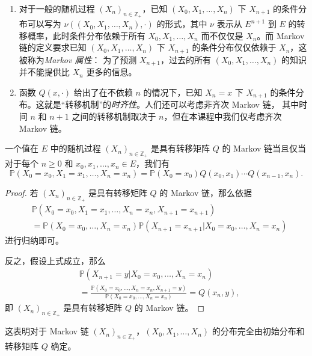 \documentclass[fontset=none]{Notes}
\begin{document}
\begin{remark}
  \mbox{}
  \begin{enumerate}
    \item 对于一般的随机过程 $(X_n)_{n\in \mathbb{Z}_+}$，已知 $(X_0,X_1,\dots,X_n)$
    下 $X_{n+1}$ 的条件分布可以写为 $\nu((X_0,X_1,\dots,X_n),\cdot)$ 的形式，其中
    $\nu$ 表示从 $E^{n+1}$ 到 $E$ 的转移概率，此时条件分布依赖于所有 $X_0,X_1,\dots,X_n$
    而不仅仅是 $X_n$。而 Markov 链的定义要求已知 $(X_0,X_1,\dots,X_n)$
    下 $X_{n+1}$ 的条件分布仅仅依赖于 $X_n$，这被称为\emph{Markov 属性}：
    为了预测 $X_{n+1}$，过去的所有 $(X_0,X_1,\dots,X_n)$ 的知识并不能提供比 $X_n$
    更多的信息。  
    \item 函数 $Q(x,\cdot)$ 给出了在不依赖 $n$ 的情况下，已知 $X_n=x$ 下 $X_{n+1}$
    的条件分布。这就是“转移机制”的\emph{时齐性}。人们还可以考虑非齐次 Markov 链，
    其中时间 $n$ 和 $n + 1$ 之间的转移机制取决于 $n$，但在本课程中我们仅考虑齐次 Markov 链。
  \end{enumerate}
\end{remark}

\begin{proposition}
  一个值在 $E$ 中的随机过程 $(X_n)_{n\in \mathbb{Z}_+}$ 是具有转移矩阵 $Q$ 的 Markov 链当且仅当
  对于每个 $n\geq 0$ 和 $x_0,x_1,\dots,x_n\in E$，我们有
  \[
    \mathbb{P}(X_0=x_0,X_1=x_1,\dots,X_n=x_n)=\mathbb{P}(X_0=x_0)
    Q(x_0,x_1)\cdots Q(x_{n-1},x_n).
  \]
\end{proposition}
\begin{proof}
  若 $(X_n)_{n\in \mathbb{Z}_+}$ 是具有转移矩阵 $Q$ 的 Markov 链，那么依据
  \begin{align*}
    &\mathbb{P}(X_0=x_0,X_1=x_1,\dots,X_n=x_n,X_{n+1}=x_{n+1})\\
    &=\mathbb{P}(X_0=x_0,\dots,X_n=x_n)\mathbb{P}(X_{n+1}=x_{n+1}|X_0=x_0,\dots,X_n=x_n)
  \end{align*}
  进行归纳即可。

  反之，假设上式成立，那么
  \begin{align*}
    &\mathbb{P}(X_{n+1}=y|X_0=x_0,\dots,X_n=x_n)\\
    &=\frac{\mathbb{P}(X_0=x_0,\dots,X_n=x_n,X_{n+1}=y)}{\mathbb{P}(X_0=x_0,\dots,X_n=x_n)}
    =Q(x_n,y),
  \end{align*}
  即 $(X_n)_{n\in \mathbb{Z}_+}$ 是具有转移矩阵 $Q$ 的 Markov 链。
\end{proof}

\begin{remark}
  这表明对于 Markov 链 $(X_n)_{n\in \mathbb{Z}_+}$，$(X_0,X_1,\dots,X_n)$
  的分布完全由初始分布和转移矩阵 $Q$ 确定。
\end{remark}
\end{document}
